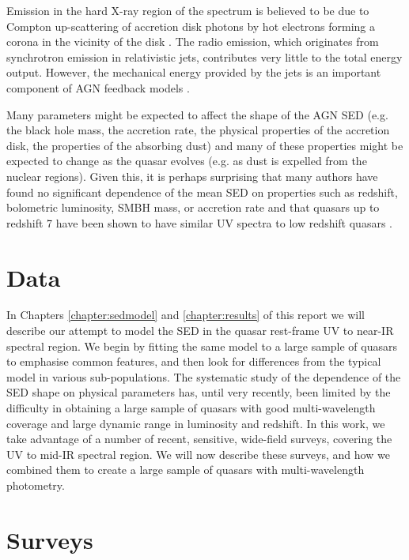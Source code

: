 Emission in the hard X-ray region of the spectrum is believed to be due to Compton up-scattering of accretion disk photons by hot electrons forming a corona in the vicinity of the disk \citep[e.g.][]{sunyaev80}. The radio emission, which originates from synchrotron emission in relativistic jets, contributes very little to the total energy output. However, the mechanical energy provided by the jets is an important component of AGN feedback models \citep[e.g.][]{fabian12}. 

Many parameters might be expected to affect the shape of the AGN SED (e.g. the black hole mass, the accretion rate, the physical properties of the accretion disk, the properties of the absorbing dust) and many of these properties might be expected to change as the quasar evolves (e.g. as dust is expelled from the nuclear regions). Given this, it is perhaps surprising that many authors have found no significant dependence of the mean SED on properties such as redshift, bolometric luminosity, SMBH mass, or accretion rate \citep[e.g.][]{elvis12,hao13} and that quasars up to redshift 7 have been shown to have similar UV spectra to low redshift quasars \citep[e.g.][]{mortlock11}.

\section{Data}

In Chapters \ref{chapter:sedmodel} and \ref{chapter:results} of this report we will describe our attempt to model the SED in the quasar rest-frame UV to near-IR spectral region. We begin by fitting the same model to a large sample of quasars to emphasise common features, and then look for differences from the typical model in various sub-populations. The systematic study of the dependence of the SED shape on physical parameters has, until very recently, been limited by the difficulty in obtaining a large sample of quasars with good multi-wavelength coverage and large dynamic range in luminosity and redshift. In this work, we take advantage of a number of recent, sensitive, wide-field surveys, covering the UV to mid-IR spectral region. We will now describe these surveys, and how we combined them to create a large sample of quasars with multi-wavelength photometry.        

\section{Surveys}

